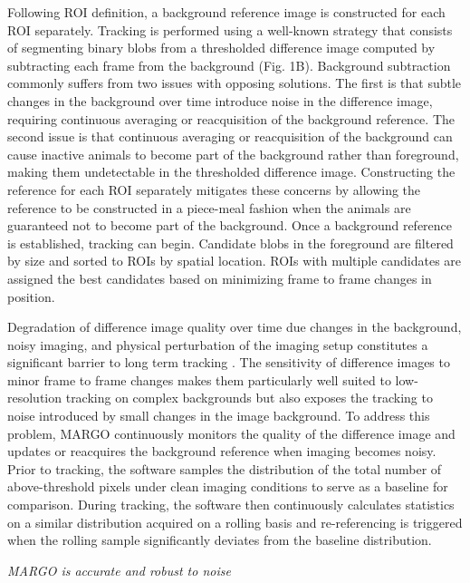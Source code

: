 \documentclass[10pt]{article}
\begin{document}
\begin{multicols}{2}
Following ROI definition, a background reference image is constructed for each ROI separately. Tracking is performed using a well-known strategy that consists of segmenting binary blobs from a thresholded difference image computed by subtracting each frame from the background (Fig. 1B). Background subtraction commonly suffers from two issues with opposing solutions. The first is that subtle changes in the background over time introduce noise in the difference image, requiring continuous averaging or reacquisition of the background reference. The second issue is that continuous averaging or reacquisition of the background can cause inactive animals to become part of the background rather than foreground, making them undetectable in the thresholded difference image. Constructing the reference for each ROI separately mitigates these concerns by allowing the reference to be constructed in a piece-meal fashion when the animals are guaranteed not to become part of the background. Once a background reference is established, tracking can begin. Candidate blobs in the foreground are filtered by size and sorted to ROIs by spatial location. ROIs with multiple candidates are assigned the best candidates based on minimizing frame to frame changes in position.

Degradation of difference image quality over time due changes in the background, noisy imaging, and physical perturbation of the imaging setup constitutes a significant barrier to long term tracking \cite{Sridhar_Tracktor_2018}. The sensitivity of difference images to minor frame to frame changes makes them particularly well suited to low-resolution tracking on complex backgrounds \cite{Liu_A_2018} but also exposes the tracking to noise introduced by small changes in the image background. To address this problem, MARGO continuously monitors the quality of the difference image and updates or reacquires the background reference when imaging becomes noisy. Prior to tracking, the software samples the distribution of the total number of above-threshold pixels under clean imaging conditions to serve as a baseline for comparison.  During tracking, the software then continuously calculates statistics on a similar distribution acquired on a rolling basis and re-referencing is triggered when the rolling sample significantly deviates from the baseline distribution.

\textit{MARGO is accurate and robust to noise}


\end{multicols}
\end{document}
